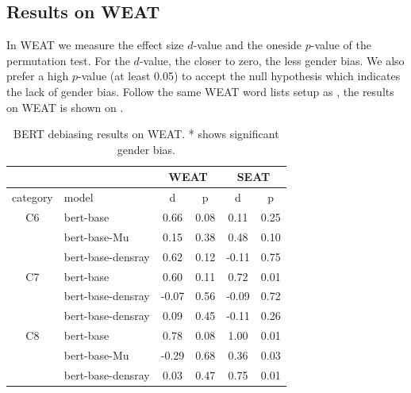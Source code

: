 \subsection{Results on WEAT}
In WEAT we measure the effect size $d$-value and the oneside $p$-value of the permutation test. For the $d$-value, the closer to zero, the less gender bias.  We also prefer a high $p$-value (at least 0.05) to accept the null hypothesis which indicates the lack of gender bias. Follow the same WEAT word lists setup as \citet{karve2019conceptor}, the results on WEAT is shown on .
\begin{table}[ht]
\centering
\scriptsize
\begin{tabular}{clcccc}
\hline
&&\multicolumn{2}{c}{WEAT}&\multicolumn{2}{c}{SEAT}\\
\hline
category & model & d & p& d & p\\
\hline
C6 & bert-base & 0.66 & 0.08 &0.11&0.25\\
& bert-base-Mu & 0.15 & 0.38&0.48&0.10\\
&bert-base-densray & 0.62 & 0.12&-0.11&0.75\\
\hline
C7 & bert-base & 0.60 & 0.11 &0.72&0.01\\
& bert-base-densray & -0.07 & 0.56&-0.09&0.72\\
& bert-base-densray & 0.09 & 0.45&-0.11&0.26\\
\hline
C8& bert-base & 0.78 & 0.08 &1.00&0.01\\
& bert-base-Mu & -0.29 & 0.68&0.36&0.03\\
& bert-base-densray & 0.03 & 0.47&0.75&0.01\\

\hline
\end{tabular}
\caption{
BERT debiasing results on WEAT. * shows significant gender bias.}
\end{table}
